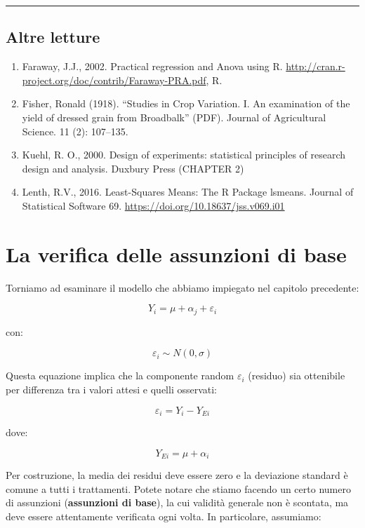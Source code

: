 \documentclass[a4paper,12pt,oneside]{book}
\providecommand{\tightlist}{%
  \setlength{\itemsep}{0pt}\setlength{\parskip}{0pt}}
\begin{document}
\begin{center}\rule{0.5\linewidth}{0.5pt}\end{center}

\hypertarget{altre-letture-6}{%
\section{Altre letture}\label{altre-letture-6}}

\begin{enumerate}
\def\labelenumi{\arabic{enumi}.}
\tightlist
\item
  Faraway, J.J., 2002. Practical regression and Anova using R. \url{http://cran.r-project.org/doc/contrib/Faraway-PRA.pdf}, R.
\item
  Fisher, Ronald (1918). ``Studies in Crop Variation. I. An examination of the yield of dressed grain from Broadbalk'' (PDF). Journal of Agricultural Science. 11 (2): 107--135.
\item
  Kuehl, R. O., 2000. Design of experiments: statistical principles of research design and analysis. Duxbury Press (CHAPTER 2)
\item
  Lenth, R.V., 2016. Least-Squares Means: The R Package lsmeans. Journal of Statistical Software 69. \url{https://doi.org/10.18637/jss.v069.i01}
\end{enumerate}

\hypertarget{la-verifica-delle-assunzioni-di-base}{%
\chapter{La verifica delle assunzioni di base}\label{la-verifica-delle-assunzioni-di-base}}

Torniamo ad esaminare il modello che abbiamo impiegato nel capitolo precedente:

\[Y_i = \mu + \alpha_j + \varepsilon_i\]

con:

\[ \varepsilon_i \sim N(0, \sigma) \]

Questa equazione implica che la componente random \(\varepsilon_i\) (residuo) sia ottenibile per differenza tra i valori attesi e quelli osservati:

\[\varepsilon_i = Y_i - Y_{Ei}\]

dove:

\[Y_{Ei} = \mu + \alpha_i\]

Per costruzione, la media dei residui deve essere zero e la deviazione standard è comune a tutti i trattamenti. Potete notare che stiamo facendo un certo numero di assunzioni (\textbf{assunzioni di base}), la cui validità generale non è scontata, ma deve essere attentamente verificata ogni volta. In particolare, assumiamo:
\end{document}
